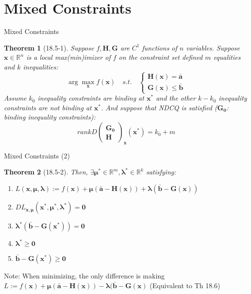 \documentclass[a4paper,11pt]{article}
\newtheorem{thm}{Theorem}
\newcommand{\bb}{\mathbb}
\newcommand{\bd}{\mathbf}
\begin{document}
\section{Mixed Constraints} %
\label{sec:mixed_constraints}
\begin{frame}[t]{Mixed Constraints}
	\begin{thm}
		[18.5-1] Suppose $f,\bd{H},\bd{G}$ are $C^1$ functions of $n$ variables. Suppose $\bd{x}\in\bb{R}^n$ is a local max(min)imizer of $f$ on the constraint set defined $m$ equalities and $k$ inequalities:\[
			\arg\max_{\bd{x}}f(\bd{x}) \quad s.t.\quad \begin{cases}
				\bd{H(\bd{x})}=\bar{\bd{a}}\\
				\bd{G(\bd{x})}\le\bar{\bd{b}}
			\end{cases}
		\]
		Assume $k_0$ inequality constraints are binding at $\bd{x^\ast}$ and the other $k-k_0$ inequality constraints are not binding at $\bd{x^\ast}$. And suppose that NDCQ is satisfied ($\bd{G_0}$: binding inequality constraints):\[
			rank  D\begin{pmatrix}
				\bd{G_0}\\
				\bd{H}
			\end{pmatrix}_{\bd{x}}(\bd{x^\ast}) = k_0 + m
		\]
	\end{thm}
\end{frame}
\begin{frame}[t]{Mixed Constraints (2)}
	\begin{thm}
		[18.5-2] Then, $\exists \bd{\mu^\ast}\in\bb{R}^m,\bd{\lambda^\ast}\in\bb{R}^k$ satisfying:
		\begin{enumerate}
			\item $L(\bd{x},\bd{\mu},\bd{\lambda}):=f(\bd{x})+\bd{\mu}(\bar{\bd{a}}-\bd{H}(\bd{x}))+\bd{\lambda}(\bar{\bd{b}}-\bd{G(\bd{x})})$
			\item $DL_{\bd{x},\bd{\mu}}(\bd{x^\ast},\bd{\mu^\ast},\bd{\lambda^\ast})=\bd{0}$
			\item $\bd{\lambda^\ast}(\bar{\bd{b}}-\bd{G}(\bd{x^\ast}))=\bd{0}$
			\item $\bd{\lambda^\ast}\ge \bd{0}$
			\item $\bar{\bd{b}}-\bd{G(\bd{x^\ast})}\ge \bd{0}$
		\end{enumerate}
	\end{thm}
	Note: When minimizing, the only difference is making $L:=f(\bd{x})+\bd{\mu}(\bar{\bd{a}}-\bd{H}(\bd{x}))-\bd{\lambda}(\bar{\bd{b}}-\bd{G(\bd{x})}$ (Equivalent to Th 18.6)
\end{frame}
\end{document}
